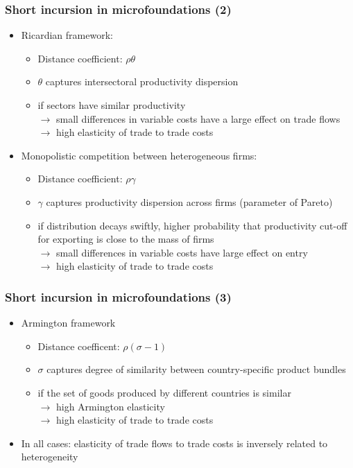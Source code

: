 \documentclass{beamer}
\begin{document}
\begin{frame}[plain]\frametitle{Short incursion in microfoundations (2)}
\vspace{.3cm}
\begin{itemize}
\item Ricardian framework: 
\begin{itemize}
\item Distance coefficient: $\rho\theta$
\item $\theta$ captures intersectoral productivity dispersion
\item if sectors have similar productivity \\ $\rightarrow$ small differences in variable costs have a large effect on trade flows
\\ $\rightarrow$ high elasticity of trade to trade costs
\end{itemize}
\vspace{.3cm}
\item Monopolistic competition between heterogeneous firms:
\begin{itemize}
\item Distance coefficient: $\rho\gamma$
\item $\gamma$ captures productivity dispersion across firms (parameter of Pareto)
\item if distribution decays swiftly, higher probability that productivity cut-off for exporting is close to the mass of firms \\ $\rightarrow$  small differences in variable costs have large effect on entry 
\\ $\rightarrow$ high elasticity of trade to trade costs
\end{itemize}
\end{itemize}
\end{frame}

\begin{frame}[plain]\frametitle{Short incursion in microfoundations (3)}
\begin{itemize}
\item Armington framework
\begin{itemize}
\item Distance coefficent:  $\rho(\sigma-1)$
\item $\sigma$ captures degree of similarity between country-specific product bundles
\item if the set of goods produced by different countries is similar \\ $\rightarrow$ high Armington elasticity 
\\ $\rightarrow$ high elasticity of trade to trade costs
\end{itemize}
\vspace{0.3cm}
\item In all cases: elasticity of trade flows to trade costs is inversely related to heterogeneity 
\end{itemize}
\end{frame}
\end{document}
